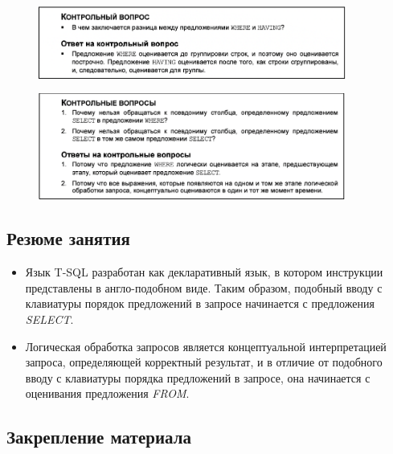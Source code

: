 \begin{figure}[h!]
	\begin{center}
		\includegraphics[width=0.9\textwidth]{img/control4.png}
	\end{center}
	\captionsetup{justification=centering}
\end{figure}

\begin{figure}[h!]
	\begin{center}
		\includegraphics[width=0.9\textwidth]{img/control5.png}
	\end{center}
	\captionsetup{justification=centering}
\end{figure}

\subsection*{Резюме занятия}
\begin{itemize}
	\item Язык T-SQL разработан как декларативный язык, в котором инструкции представлены в англо-подобном виде. Таким образом, подобный вводу с клавиатуры порядок предложений в запросе начинается с предложения \textit{SELECT}. 
	\item Логическая обработка запросов является концептуальной интерпретацией запроса, определяющей корректный результат, и в отличие от подобного вводу с клавиатуры порядка предложений в запросе, она начинается с оценивания предложения \textit{FROM}. 
\end{itemize}


\subsection*{Закрепление материала}

